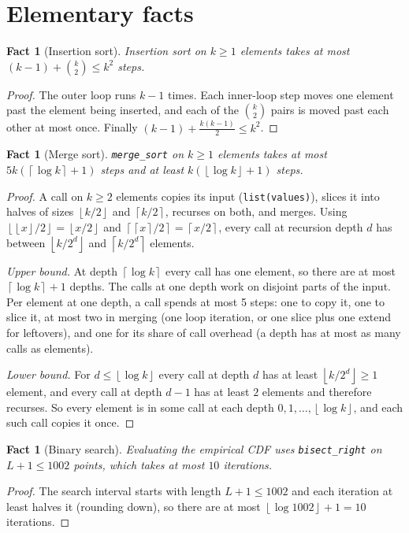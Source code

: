 \documentclass[11pt]{article}
\newtheorem{fact}[theorem]{Fact}
\theoremstyle{definition}
\theoremstyle{remark}
\newcommand{\ceil}[1]{\left\lceil #1 \right\rceil}
\newcommand{\floor}[1]{\left\lfloor #1 \right\rfloor}
\newcommand{\code}[1]{\texttt{#1}}
\begin{document}
\section{Elementary facts}

\begin{fact}[Insertion sort]\label{fact:ins}
Insertion sort on $k\ge1$ elements takes at most $(k-1)+\binom{k}{2}\le k^2$
steps.
\end{fact}
\begin{proof}
The outer loop runs $k-1$ times. Each inner-loop step moves one element
past the element being inserted, and each of the $\binom k2$ pairs is
moved past each other at most once. Finally
$(k-1)+\tfrac{k(k-1)}{2}\le k^2$.
\end{proof}

\begin{fact}[Merge sort]\label{fact:merge}
\code{merge\_sort} on $k\ge1$ elements takes at most $5k(\ceil{\log k}+1)$
steps and at least $k(\floor{\log k}+1)$ steps.
\end{fact}
\begin{proof}
A call on $k\ge2$ elements copies its input (\code{list(values)}), slices it
into halves of sizes $\floor{k/2}$ and $\ceil{k/2}$, recurses on both, and
merges. Using $\floor{\floor{x}/2}=\floor{x/2}$ and
$\ceil{\ceil{x}/2}=\ceil{x/2}$, every call at recursion depth $d$ has
between $\floor{k/2^d}$ and $\ceil{k/2^d}$ elements.

\emph{Upper bound.} At depth $\ceil{\log k}$ every call has one element, so
there are at most $\ceil{\log k}+1$ depths. The calls at one depth work on
disjoint parts of the input. Per element at one depth, a call spends at most
5 steps: one to copy it, one to slice it, at most two in merging (one loop
iteration, or one slice plus one extend for leftovers), and one for its
share of call overhead (a depth has at most as many calls as elements).

\emph{Lower bound.} For $d\le\floor{\log k}$ every call at depth $d$ has at
least $\floor{k/2^d}\ge1$ element, and every call at depth $d-1$ has at
least $2$ elements and therefore recurses. So every element is in some call
at each depth $0,1,\dots,\floor{\log k}$, and each such call copies it once.
\end{proof}

\begin{fact}[Binary search]\label{fact:bs}
Evaluating the empirical CDF uses \code{bisect\_right} on $L+1\le 1002$
points, which takes at most $10$ iterations.
\end{fact}
\begin{proof}
The search interval starts with length $L+1\le1002$ and each iteration at
least halves it (rounding down), so there are at most
$\floor{\log 1002}+1=10$ iterations.
\end{proof}
\end{document}
